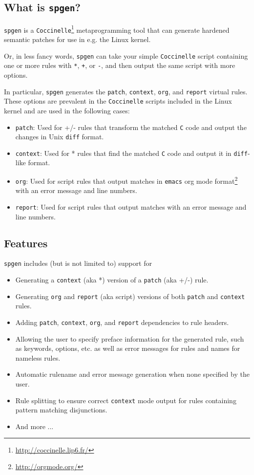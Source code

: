\subsection{What is \texttt{spgen}?}
\texttt{spgen} is a \texttt{Coccinelle}\footnote{\hyperref[http://coccinelle.lip6.fr/]{http://coccinelle.lip6.fr/}} metaprogramming tool that can generate hardened semantic patches for use in e.g. the Linux kernel.

Or, in less fancy words, \texttt{spgen} can take your simple \texttt{Coccinelle} script containing one or more rules with \texttt{*}, \texttt{+}, or \texttt{-}, and then output the same script with more options.

In particular, \texttt{spgen} generates the \texttt{patch}, \texttt{context}, \texttt{org}, and \texttt{report} virtual rules. These options are prevalent in the \texttt{Coccinelle} scripts included in the Linux kernel and are used in the following cases:

\begin{itemize}
\item \texttt{patch}: Used for +/- rules that transform the matched \texttt{C} code and output the changes in Unix \texttt{diff} format.
\item \texttt{context}: Used for * rules that find the matched \texttt{C} code and output it in \texttt{diff}-like format.
\item \texttt{org}: Used for script rules that output matches in
  \texttt{emacs} org mode
  format\footnote{\hyperref[http://orgmode.org/]{http://orgmode.org/}} with
  an error message and line numbers.
\item \texttt{report}: Used for script rules that output matches with an error message and line numbers.
\end{itemize}
\bigskip

\subsection{Features}
\texttt{spgen} includes (but is not limited to) support for
\begin{itemize}
\item Generating a \texttt{context} (aka *) version of a \texttt{patch} (aka +/-) rule.
\item Generating \texttt{org} and \texttt{report} (aka script) versions of both \texttt{patch} and \texttt{context} rules.
\item Adding \texttt{patch}, \texttt{context}, \texttt{org}, and \texttt{report} dependencies to rule headers.
\item Allowing the user to specify preface information for the generated rule, such as keywords, options, etc. as well as error messages for rules and names for nameless rules.
\item Automatic rulename and error message generation when none specified by the user.
\item Rule splitting to ensure correct \texttt{context} mode output for rules containing pattern matching disjunctions.
\item And more ...
\end{itemize}